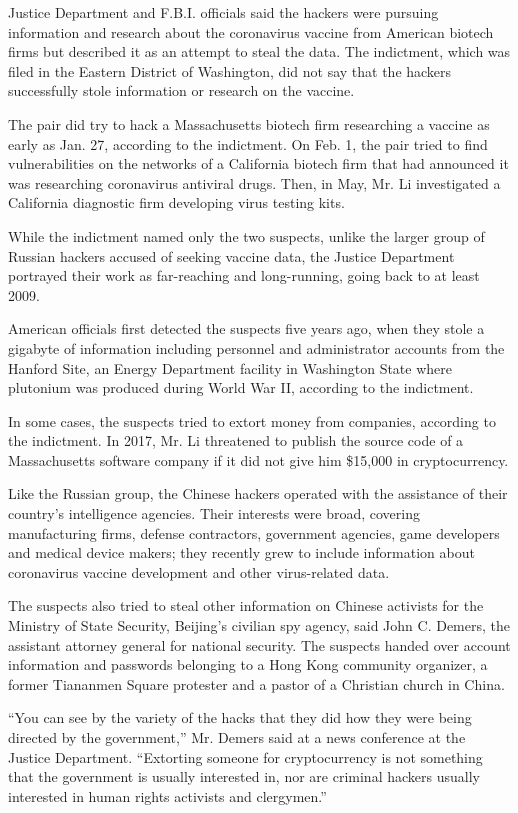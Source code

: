 Justice Department and F.B.I. officials said the hackers were pursuing
information and research about the coronavirus vaccine from American
biotech firms but described it as an attempt to steal the data. The
indictment, which was filed in the Eastern District of Washington, did
not say that the hackers successfully stole information or research on
the vaccine.

The pair did try to hack a Massachusetts biotech firm researching a
vaccine as early as Jan. 27, according to the indictment. On Feb. 1, the
pair tried to find vulnerabilities on the networks of a California
biotech firm that had announced it was researching coronavirus antiviral
drugs. Then, in May, Mr. Li investigated a California diagnostic firm
developing virus testing kits.

While the indictment named only the two suspects, unlike the larger
group of Russian hackers accused of seeking vaccine data, the Justice
Department portrayed their work as far-reaching and long-running, going
back to at least 2009.

American officials first detected the suspects five years ago, when they
stole a gigabyte of information including personnel and administrator
accounts from the Hanford Site, an Energy Department facility in
Washington State where plutonium was produced during World War II,
according to the indictment.

In some cases, the suspects tried to extort money from companies,
according to the indictment. In 2017, Mr. Li threatened to publish the
source code of a Massachusetts software company if it did not give him
\$15,000 in cryptocurrency.

Like the Russian group, the Chinese hackers operated with the assistance
of their country's intelligence agencies. Their interests were broad,
covering manufacturing firms, defense contractors, government agencies,
game developers and medical device makers; they recently grew to include
information about coronavirus vaccine development and other
virus-related data.

The suspects also tried to steal other information on Chinese activists
for the Ministry of State Security, Beijing's civilian spy agency, said
John C. Demers, the assistant attorney general for national security.
The suspects handed over account information and passwords belonging to
a Hong Kong community organizer, a former Tiananmen Square protester and
a pastor of a Christian church in China.

``You can see by the variety of the hacks that they did how they were
being directed by the government,'' Mr. Demers said at a news conference
at the Justice Department. ``Extorting someone for cryptocurrency is not
something that the government is usually interested in, nor are criminal
hackers usually interested in human rights activists and clergymen.''

